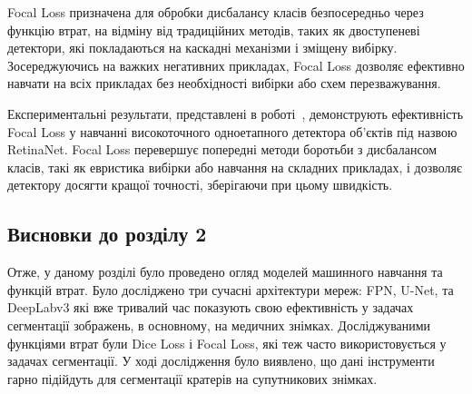 Focal Loss призначена для обробки дисбалансу класів безпосередньо через функцію
втрат, на відміну від традиційних методів, таких як двоступеневі детектори, які
покладаються на каскадні механізми і зміщену вибірку. Зосереджуючись на важких
негативних прикладах, Focal Loss дозволяє ефективно навчати на всіх прикладах
без необхідності вибірки або схем перезважування.

Експериментальні результати, представлені в роботі~\cite{lin2017},
демонструють ефективність Focal Loss у навчанні високоточного
одноетапного детектора об'єктів під назвою RetinaNet.
Focal Loss перевершує попередні методи боротьби з дисбалансом класів,
такі як евристика вибірки або навчання на складних прикладах,
і дозволяє детектору досягти кращої точності, зберігаючи при цьому швидкість.

\subsection*{Висновки до розділу 2}
Отже, у даному розділі було проведено огляд моделей машинного навчання
та функцій втрат. Було досліджено три сучасні архітектури мереж: FPN, U-Net, та DeepLabv3 які вже
тривалий час показують свою ефективність у задачах сегментації зображень,
в основному, на медичних знімках. Досліджуваними функціями втрат були
Dice Loss і Focal Loss, які теж часто використовується у задачах сегментації. У ході
дослідження було виявлено, що дані інструменти гарно підійдуть для
сегментації кратерів на супутникових знімках.